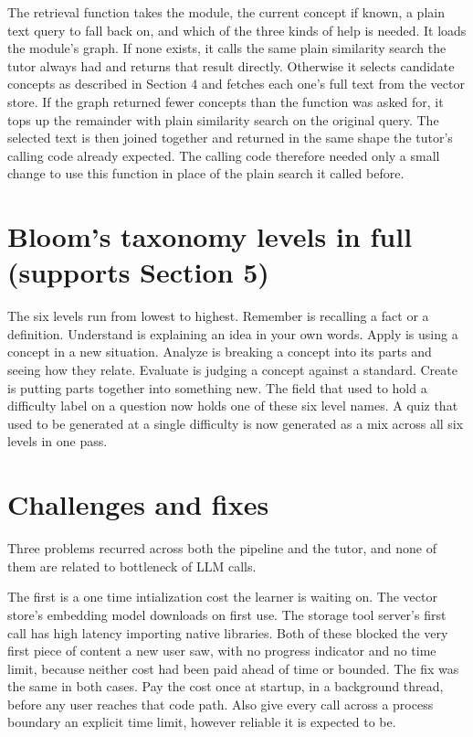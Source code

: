 \documentclass{ecai}
\begin{document}
The retrieval function takes the module, the current concept if known, a
plain text query to fall back on, and which of the three kinds of help is
needed. It loads the module's graph. If none exists, it calls the same plain
similarity search the tutor always had and returns that result directly.
Otherwise it selects candidate concepts as described in Section 4 and fetches
each one's full text from the vector store. If the graph returned fewer
concepts than the function was asked for, it tops up the remainder with plain
similarity search on the original query. The selected text is then joined
together and returned in the same shape the tutor's calling code already
expected. The calling code therefore needed only a small change to use this
function in place of the plain search it called before.

\section{Bloom's taxonomy levels in full (supports Section 5)}

The six levels run from lowest to highest. Remember is recalling a fact or a
definition. Understand is explaining an idea in your own words. Apply is using a
concept in a new situation. Analyze is breaking a concept into its parts and
seeing how they relate. Evaluate is judging a concept against a standard. Create
is putting parts together into something new. The field that used to hold a
difficulty label on a question now holds one of these six level names. A quiz
that used to be generated at a single difficulty is now generated as a mix
across all six levels in one pass.

\section{Challenges and fixes}

Three problems recurred across both the pipeline and the tutor, and none of
them are related to bottleneck of LLM calls.

The first is a one time intialization cost the learner is waiting
on. The vector store's embedding model downloads on first use. The storage tool
server's first call has high latency importing native libraries.
Both of these blocked the very first piece of content a new user saw, with no
progress indicator and no time limit, because neither cost had been paid ahead
of time or bounded. The fix was the same in both cases. Pay the cost once at
startup, in a background thread, before any user reaches that code path. Also
give every call across a process boundary an explicit time limit, however
reliable it is expected to be.
\end{document}
